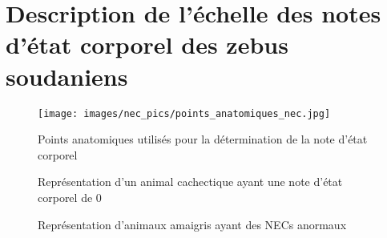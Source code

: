 \chapter{Description de l'échelle des notes d'état corporel des zebus soudaniens} \label{annex:nec-guide}

\renewcommand{\thefigure}{A.\arabic{figure}}
\setcounter{figure}{0}



\begin{figure}[!ht]
	\centering
	\texttt{[image: images/nec\_pics/points\_anatomiques\_nec.jpg]}
	\caption[Points anatomiques utilisés pour la détermination de la note d'état corporel]
	{Points anatomiques utilisés pour la détermination de la note d'état corporel
		\label{fig:points_anatomiques}}
\end{figure}

\begin{figure}[!ht]
	
	{
		\begin{center}
		\end{center}
	}
	\caption[Représentation d'un animal cachectique ayant une note d'état corporel de 0]
	{Représentation d'un animal cachectique ayant une note d'état corporel de 0  \label{fig:nec_0}}
\end{figure}

\begin{figure}[!ht]
	
	{
		\begin{center}
		\end{center}
	}
	\caption[Représentation d'animaux amaigris ayant des notes d'etat corporel anormaux]
	{Représentation d'animaux amaigris ayant des NECs anormaux \label{fig:nec_1}  }
\end{figure}

